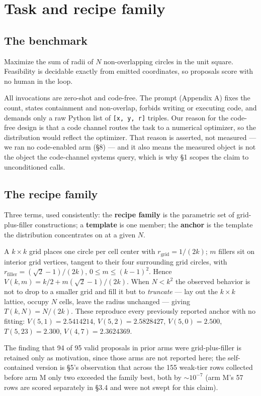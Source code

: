 \documentclass[11pt]{article}
\begin{document}
\section{Task and recipe family}

\subsection{The benchmark}

Maximize the sum of radii of $N$ non-overlapping circles in the unit square. Feasibility is
decidable exactly from emitted coordinates, so proposals score with no human in the loop.

All invocations are zero-shot and code-free. The prompt (Appendix A) fixes the count, states
containment and non-overlap, forbids writing or executing code, and demands only a raw Python
list of \texttt{[x, y, r]} triples. Our reason for the code-free design is that a code channel routes
the task to a numerical optimizer, so the distribution would reflect the optimizer. That reason
is asserted, not measured --- we ran no code-enabled arm (\S8) --- and it also means the measured
object is not the object the code-channel systems query, which is why \S1 scopes the claim to
unconditioned calls.

\subsection{The recipe family}

Three terms, used consistently: the \textbf{recipe family} is the parametric set of grid-plus-filler
constructions; a \textbf{template} is one member; the \textbf{anchor} is the template the distribution
concentrates on at a given $N$.

A $k \times k$ grid places one circle per cell center with $r_{\mathrm{grid}} = 1/(2k)$; $m$ fillers sit on interior
grid vertices, tangent to their four surrounding grid circles, with $r_{\mathrm{filler}} = (\sqrt{2} - 1)/(2k)$,
$0 \le m \le (k-1)^2$. Hence $V(k, m) = k/2 + m(\sqrt{2} - 1)/(2k)$. When $N < k^2$ the observed behavior is not
to drop to a smaller grid and fill it but to \textit{truncate} --- lay out the $k \times k$ lattice, occupy $N$
cells, leave the radius unchanged --- giving $T(k, N) = N/(2k)$. These reproduce every previously
reported anchor with no fitting: $V(5,1) = 2.5414214$, $V(5,2) = 2.5828427$, $V(5,0) = 2.500$,
$T(5,23) = 2.300$, $V(4,7) = 2.3624369$.

The finding that 94 of 95 valid proposals in prior arms were grid-plus-filler is retained only as
motivation, since those arms are not reported here; the self-contained version is \S5's
observation that across the 155 weak-tier rows collected before arm M only two exceeded the
family best, both by ${\sim}10^{-7}$ (arm M's 57 rows are scored separately in \S3.4 and were
not swept for this claim).
\end{document}
